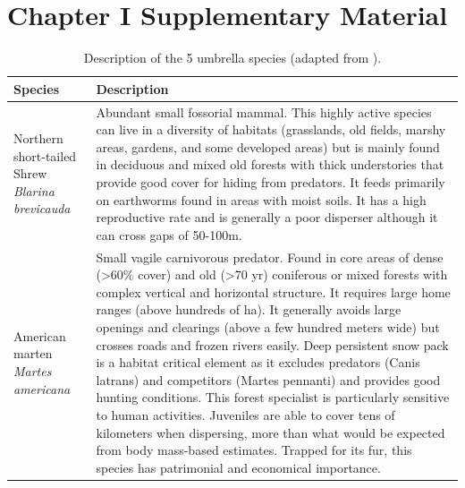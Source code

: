 
\chapter*{\textbf{Chapter I Supplementary Material \\ \hspace{1em}}}

\setcounter{chapter}{3}
\setcounter{table}{0}
\setcounter{figure}{0}


\begin{longtable}[c]{|p{5cm}|p{11cm}|}
\caption{Description of the 5 umbrella species (adapted from \cite{rayfield_priorisation_2018}).}
\label{tab:species} \\
\hline
\hline
\textbf{Species} & \textbf{Description} \\ \hline
Northern short-tailed Shrew \newline \textit{Blarina brevicauda} & Abundant small fossorial mammal. This highly active species can live in a diversity of habitats (grasslands, old fields, marshy areas, gardens, and some developed areas) but is mainly found in deciduous and mixed old forests with thick understories that provide good cover for hiding from predators. It feeds primarily on earthworms found in areas with moist soils. It has a high reproductive rate and is generally a poor disperser although it can cross gaps of 50-100m. \\ \hline
American marten \newline \textit{Martes americana} & Small vagile carnivorous predator. Found in core areas of dense (\textgreater{}60\% cover) and old (\textgreater{}70 yr) coniferous or mixed forests with complex vertical and horizontal structure. It requires large home ranges (above hundreds of ha). It generally avoids large openings and clearings (above a few hundred meters wide) but crosses roads and frozen rivers easily. Deep persistent snow pack is a habitat critical element as it excludes predators (Canis latrans) and competitors (Martes pennanti) and provides good hunting conditions. This forest specialist is particularly sensitive to human activities. Juveniles are able to cover tens of kilometers when dispersing, more than what would be expected from body mass-based estimates. Trapped for its fur, this species has patrimonial and economical importance. \\ \hline

\end{longtable}
